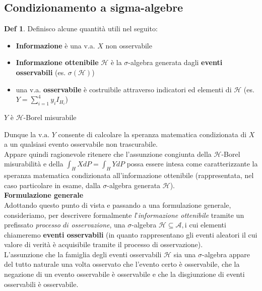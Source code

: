 \documentclass[a4paper,11pt]{article}
\theoremstyle{plain}
\theoremstyle{definition}
\newtheorem{defn}{Def}[section]
\theoremstyle{remark}
\begin{document}
\subsection{Condizionamento a sigma-algebre}
\begin{defn} Definisco alcune quantità utili nel seguito:
\begin{itemize}
    \item   \textbf{Informazione}   è una v.a. $X$ non osservabile
    \item   \textbf{Informazione ottenibile} $\mathcal{H}$ è la $\sigma$-algebra generata dagli \textbf{eventi osservabili} (es. $\sigma(\mathcal{H})$)
    \item una v.a. \textbf{osservabile} è costruibile attraverso indicatori ed elementi di $\mathcal{H}$ (es. $Y=\sum_{i=1}^4 y_i I_{H_i}$)
\end{itemize}
\end{defn}
\noindent
$ Y$ è $\mathcal{H}$-Borel misurabile 

\noindent
Dunque la $\mathrm{v}.\mathrm{a}.$ $Y$ consente di calcolare la speranza matematica condizionata di $X$ a un qualsiasi evento osservabile non trascurabile. \\


\noindent
Appare quindi ragionevole ritenere che l'assunzione congiunta della $\mathcal{H}$-Borel misurabilità $\mathrm{e}$ della $\displaystyle \int_H XdP=\int_H YdP$ possa essere intesa come caratterizzante la speranza matematica condizionata all'informazione ottenibile (rappresentata, nel caso particolare in esame, dalla $\sigma$-algebra generata $\mathcal{H}$).\\

\noindent
\textbf{Formulazione generale}\\
Adottando questo punto di vista $\mathrm{e}$ passando a una formulazione generale, consideriamo, per descrivere formalmente {\it l}'{\it informazione ottenibile} tramite un prefissato {\it processo} $di$ {\it osservazione}, una $\sigma$-algebra $\mathcal{H}\subseteq \mathcal{A}, \mathrm{i}$ cui elementi chiameremo \textbf{eventi osservabili} (in quanto rappresentano gli eventi aleatori il cui valore di verità è acquisibile tramite il processo di osservazione).\\

\noindent
L'assunzione che la famiglia degli eventi osservabili $\mathcal{H}$ sia una $\sigma$-algebra appare del tutto naturale una volta osservato che l'evento certo è osservabile, che la negazione di un evento osservabile è osservabile $\mathrm{e}$ che la disgiunzione di eventi osservabili è osservabile.
\end{document}
